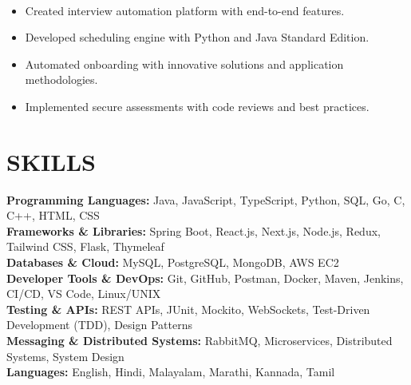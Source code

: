 \documentclass[10pt,a4paper]{article}
\begin{document}
\noindent
{}\\[-12pt]

\begin{itemize}

\item Created interview automation platform with end-to-end features.

\item Developed scheduling engine with Python and Java Standard Edition.

\item Automated onboarding with innovative solutions and application methodologies.

\item Implemented secure assessments with code reviews and best practices.

\end{itemize}
\section*{SKILLS}

\small

\textbf{Programming Languages:}
Java, JavaScript, TypeScript, Python, SQL, Go, C, C++, HTML, CSS
\\[2pt]
\textbf{Frameworks \& Libraries:}
Spring Boot, React.js, Next.js, Node.js, Redux, Tailwind CSS, Flask, Thymeleaf
\\[2pt]
\textbf{Databases \& Cloud:}
MySQL, PostgreSQL, MongoDB, AWS EC2
\\[2pt]
\textbf{Developer Tools \& DevOps:}
Git, GitHub, Postman, Docker, Maven, Jenkins, CI/CD, VS Code, Linux/UNIX
\\[2pt]
\textbf{Testing \& APIs:}
REST APIs, JUnit, Mockito, WebSockets, Test-Driven Development (TDD), Design Patterns
\\[2pt]
\textbf{Messaging \& Distributed Systems:}
RabbitMQ, Microservices, Distributed Systems, System Design
\\[2pt]
\textbf{Languages:}
English, Hindi, Malayalam, Marathi, Kannada, Tamil

\end{document}
